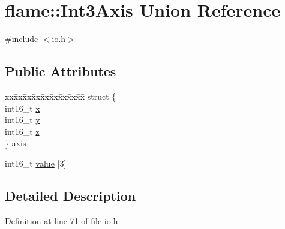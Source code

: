 \hypertarget{unionflame_1_1_int3_axis}{\section{flame\-:\-:Int3\-Axis Union Reference}
\label{unionflame_1_1_int3_axis}
}


{\ttfamily \#include $<$io.\-h$>$}

\subsection*{Public Attributes}
\begin{DoxyCompactItemize}
\item 
\begin{tabbing}
xx\=xx\=xx\=xx\=xx\=xx\=xx\=xx\=xx\=\kill
struct \{\\
\>int16\_t \hyperlink{unionflame_1_1_int3_axis_a5afc91d24e7c9a8e84fd076d01525a44}{x}\\
\>int16\_t \hyperlink{unionflame_1_1_int3_axis_a214fbd1192879a9ae9975b819cb7ea9f}{y}\\
\>int16\_t \hyperlink{unionflame_1_1_int3_axis_a07fa76bf97419e5fd100872978ab2a56}{z}\\
\} \hyperlink{unionflame_1_1_int3_axis_a82f911e02da3e252d5efd2dffff63b9d}{axis}\\

\end{tabbing}\item 
int16\-\_\-t \hyperlink{unionflame_1_1_int3_axis_a45f54ece82ccc5f3045ba30fe814b912}{value} \mbox{[}3\mbox{]}
\end{DoxyCompactItemize}


\subsection{Detailed Description}


Definition at line 71 of file io.\-h.



